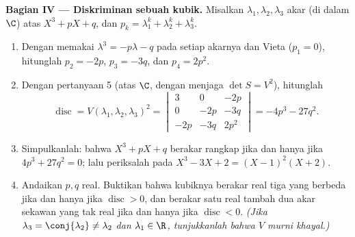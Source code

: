 \begin{problem}
\medskip
\noindent\textbf{Bagian IV --- Diskriminan sebuah kubik.} Misalkan
$\lambda_1, \lambda_2, \lambda_3$ akar (di dalam $\C$) atas $X^3
+ pX + q$, dan $p_k = \lambda_1^k + \lambda_2^k + \lambda_3^k$.
\begin{enumerate}[resume]
  \item Dengan memakai $\lambda^3 = -p\lambda - q$ pada setiap akarnya dan
        Vieta ($p_1 = 0$), hitunglah $p_2 = -2p$, $p_3 = -3q$, dan
        $p_4 = 2p^2$.
  \item Dengan pertanyaan 5 (atas $\C$, dengan menjaga $\det S = V^2$),
        hitunglah
        \[
        \operatorname{disc} = V(\lambda_1, \lambda_2,
        \lambda_3)^2 = \begin{vmatrix}
        3 & 0 & -2p\\
        0 & -2p & -3q\\
        -2p & -3q & 2p^2
        \end{vmatrix}
        = -4p^3 - 27q^2 .
        \]
  \item Simpulkanlah: bahwa $X^3 + pX + q$ berakar rangkap jika dan hanya
        jika $4p^3 + 27q^2 = 0$; lalu periksalah pada $X^3 - 3X + 2 = (X -
        1)^2(X + 2)$.
  \item Andaikan $p, q$ real. Buktikan bahwa kubiknya berakar real
        tiga yang berbeda jika dan hanya jika $\operatorname{disc}
        > 0$, dan berakar satu real tambah dua akar sekawan yang tak real jika
        dan hanya jika $\operatorname{disc} < 0$. \emph{(Jika
        $\lambda_3 = \conj{\lambda_2} \neq \lambda_2$ dan
        $\lambda_1 \in \R$, tunjukkanlah bahwa $V$ murni khayal.)}
\end{enumerate}


\end{problem}
